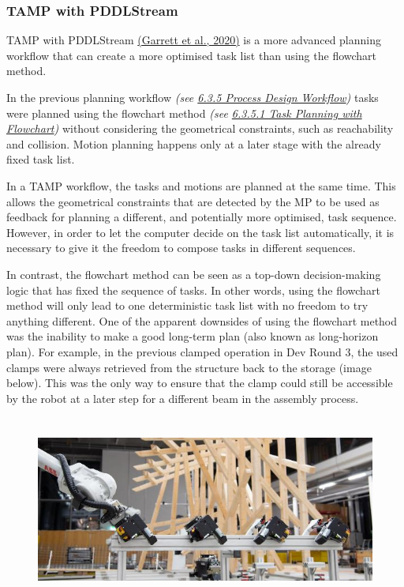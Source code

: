 \documentclass[11pt]{book}
\begin{document}
\subsubsection{TAMP with PDDLStream}

TAMP with PDDLStream \href{https://www.zotero.org/google-docs/?nU79EO}{(Garrett et al., 2020)} is a more advanced planning workflow that can create a more optimised task list than using the flowchart method.

In the previous planning workflow \textit{(see \uline{6.3.5 Process Design Workflow})} tasks were planned using the flowchart method \textit{(see \uline{6.3.5.1 Task Planning with Flowchart})} without considering the geometrical constraints, such as reachability and collision. Motion planning happens only at a later stage with the already fixed task list. 

In a TAMP workflow, the tasks and motions are planned at the same time. This allows the geometrical constraints that are detected by the MP to be used as feedback for planning a different, and potentially more optimised, task sequence. However, in order to let the computer decide on the task list automatically, it is necessary to give it the freedom to compose tasks in different sequences. 

In contrast, the flowchart method can be seen as a top-down decision-making logic that has fixed the sequence of tasks. In other words, using the flowchart method will only lead to one deterministic task list with no freedom to try anything different. One of the apparent downsides of using the flowchart method was the inability to make a good long-term plan (also known as long-horizon plan). For example, in the previous clamped operation in Dev Round 3, the used clamps were always retrieved from the structure back to the storage (image below). This was the only way to ensure that the clamp could still be accessible by the robot at a later step for a different beam in the assembly process. 

\begin{figure}[H]
\includegraphics[width=14.33cm,height=6.14cm]{./images/image2.jpeg}
\end{figure}
\end{document}
